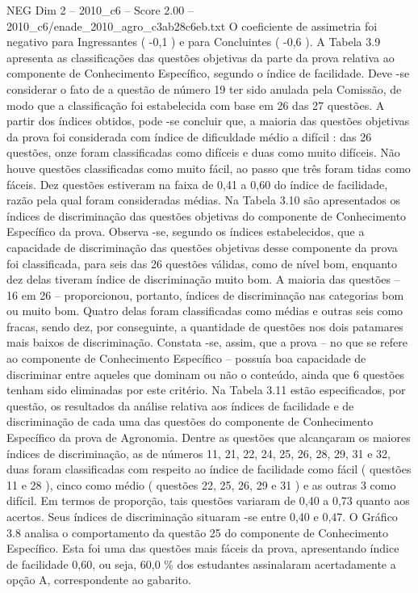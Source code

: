 \begin{textsample}{NEG Dim 2 – 2010\_c6 – Score 2.00 – 2010\_c6/enade\_2010\_agro\_c3ab28c6eb.txt}
O coeficiente de assimetria foi negativo para Ingressantes ( -0,1 ) e para Concluintes ( -0,6 ).
A Tabela 3.9 apresenta as classificações das questões objetivas da parte da prova relativa ao componente de Conhecimento Específico, segundo o índice de facilidade.
Deve -se considerar o fato de a questão de número 19 ter sido anulada pela Comissão, de modo que a classificação foi estabelecida com base em 26 das 27 questões.
A partir dos índices obtidos, pode -se concluir que, a maioria das questões objetivas da prova foi considerada com índice de dificuldade médio a difícil : das 26 questões, onze foram classificadas como difíceis e duas como muito difíceis.
Não houve questões classificadas como muito fácil, ao passo que três foram tidas como fáceis.
Dez questões estiveram na faixa de 0,41 a 0,60 do índice de facilidade, razão pela qual foram consideradas médias.
Na Tabela 3.10 são apresentados os índices de discriminação das questões objetivas do componente de Conhecimento Específico da prova.
Observa -se, segundo os índices estabelecidos, que a capacidade de discriminação das questões objetivas desse componente da prova foi classificada, para seis das 26 questões válidas, como de nível bom, enquanto dez delas tiveram índice de discriminação muito bom.
A maioria das questões – 16 em 26 – proporcionou, portanto, índices de discriminação nas categorias bom ou muito bom.
Quatro delas foram classificadas como médias e outras seis como fracas, sendo dez, por conseguinte, a quantidade de questões nos dois patamares mais baixos de discriminação.
Constata -se, assim, que a prova – no que se refere ao componente de Conhecimento Específico – possuía boa capacidade de discriminar entre aqueles que dominam ou não o conteúdo, ainda que 6 questões tenham sido eliminadas por este critério.
Na Tabela 3.11 estão especificados, por questão, os resultados da análise relativa aos índices de facilidade e de discriminação de cada uma das questões do componente de Conhecimento Específico da prova de Agronomia.
Dentre as questões que alcançaram os maiores índices de discriminação, as de números 11, 21, 22, 24, 25, 26, 28, 29, 31 e 32, duas foram classificadas com respeito ao índice de facilidade como fácil ( questões 11 e 28 ), cinco como médio ( questões 22, 25, 26, 29 e 31 ) e as outras 3 como difícil.
Em termos de proporção, tais questões variaram de 0,40 a 0,73 quanto aos acertos.
Seus índices de discriminação situaram -se entre 0,40 e 0,47.
O Gráfico 3.8 analisa o comportamento da questão 25 do componente de Conhecimento Específico.
Esta foi uma das questões mais fáceis da prova, apresentando índice de facilidade 0,60, ou seja, 60,0 \% dos estudantes assinalaram acertadamente a opção A, correspondente ao gabarito.

\end{textsample}
